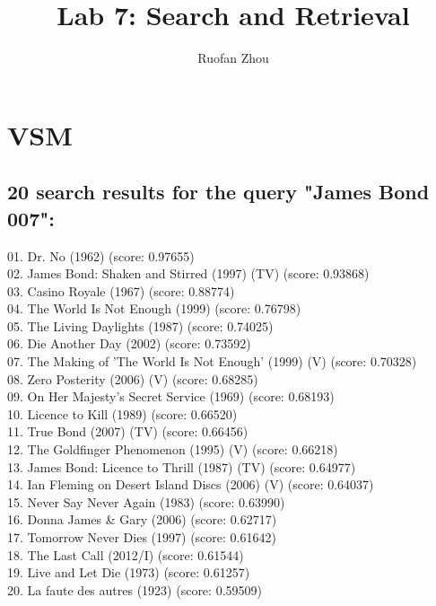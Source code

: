 \documentclass[11pt]{article} %
\title{Lab 7: Search and Retrieval}
\author{Ruofan Zhou}
\begin{document}
\maketitle

\section{VSM}
\subsection{
20 search results for the query "James Bond 007": }
\tiny
01. Dr. No (1962) (score: 0.97655) \\
02. James Bond: Shaken and Stirred (1997) (TV) (score: 0.93868) \\
03. Casino Royale (1967) (score: 0.88774) \\
04. The World Is Not Enough (1999) (score: 0.76798)\\
05. The Living Daylights (1987) (score: 0.74025)\\
06. Die Another Day (2002) (score: 0.73592)\\
07. The Making of 'The World Is Not Enough' (1999) (V) (score: 0.70328)\\
08. Zero Posterity (2006) (V) (score: 0.68285)\\
09. On Her Majesty's Secret Service (1969) (score: 0.68193)\\
10. Licence to Kill (1989) (score: 0.66520)\\
11. True Bond (2007) (TV) (score: 0.66456)\\
12. The Goldfinger Phenomenon (1995) (V) (score: 0.66218)\\
13. James Bond: Licence to Thrill (1987) (TV) (score: 0.64977)\\
14. Ian Fleming on Desert Island Discs (2006) (V) (score: 0.64037)\\
15. Never Say Never Again (1983) (score: 0.63990)\\
16. Donna James \& Gary (2006) (score: 0.62717)\\
17. Tomorrow Never Dies (1997) (score: 0.61642)\\
18. The Last Call (2012/I) (score: 0.61544)\\
19. Live and Let Die (1973) (score: 0.61257)\\
20. La faute des autres (1923) (score: 0.59509)\\
\normalsize
\end{document}

